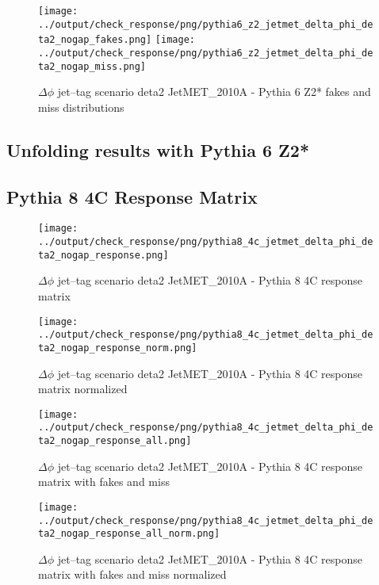 \documentclass[11pt]{book}
\begin{document}
\begin{figure}[ht]
\centering
\texttt{[image: ../output/check\_response/png/pythia6\_z2\_jetmet\_delta\_phi\_deta2\_nogap\_fakes.png]}
\texttt{[image: ../output/check\_response/png/pythia6\_z2\_jetmet\_delta\_phi\_deta2\_nogap\_miss.png]}
\caption{$\Delta\phi$ jet--tag scenario deta2 JetMET\_2010A - Pythia 6 Z2* fakes and miss distributions}
\label{p6_jetmet_delta_phi_deta2_nogap_fakesmiss}
\end{figure}


\clearpage
\subsection{Unfolding results with Pythia 6 Z2*}


\clearpage
\subsection{Pythia 8 4C Response Matrix}


\begin{figure}[ht]
\centering
\texttt{[image: ../output/check\_response/png/pythia8\_4c\_jetmet\_delta\_phi\_deta2\_nogap\_response.png]}
\caption{$\Delta\phi$ jet--tag scenario deta2 JetMET\_2010A - Pythia 8 4C response matrix}
\label{p8_jetmet_delta_phi_deta2_nogap_response}
\end{figure}

\begin{figure}[ht]
\centering
\texttt{[image: ../output/check\_response/png/pythia8\_4c\_jetmet\_delta\_phi\_deta2\_nogap\_response\_norm.png]}
\caption{$\Delta\phi$ jet--tag scenario deta2 JetMET\_2010A - Pythia 8 4C response matrix normalized}
\label{p8_jetmet_delta_phi_deta2_nogap_response_norm}
\end{figure}

\begin{figure}[ht]
\centering
\texttt{[image: ../output/check\_response/png/pythia8\_4c\_jetmet\_delta\_phi\_deta2\_nogap\_response\_all.png]}
\caption{$\Delta\phi$ jet--tag scenario deta2 JetMET\_2010A - Pythia 8 4C response matrix with fakes and miss}
\label{p8_jetmet_delta_phi_deta2_nogap_response_all}
\end{figure}

\begin{figure}[ht]
\centering
\texttt{[image: ../output/check\_response/png/pythia8\_4c\_jetmet\_delta\_phi\_deta2\_nogap\_response\_all\_norm.png]}
\caption{$\Delta\phi$ jet--tag scenario deta2 JetMET\_2010A - Pythia 8 4C response matrix with fakes and miss normalized}
\label{p8_jetmet_delta_phi_deta2_nogap_response_all_norm}
\end{figure}
\end{document}
